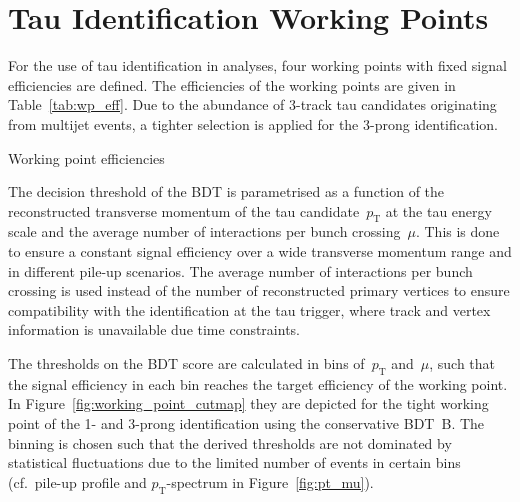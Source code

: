 \section{Tau Identification Working Points}
\label{sec:bdt_working_points}

For the use of tau identification in analyses, four working points with fixed
signal efficiencies are defined. The efficiencies of the working points are
given in Table~\ref{tab:wp_eff}. Due to the abundance of 3-track tau candidates
originating from multijet events, a tighter selection is applied for the 3-prong
identification.

\begin{table}[htb]
  \centering
  {\small}
  \caption{Working point efficiencies}
  \label{tab:wp_eff}
\end{table}

The decision threshold of the BDT is parametrised as a function of the
reconstructed transverse momentum of the tau candidate~$p_\text{T}$ at the tau
energy scale and the average number of interactions per bunch crossing~$\mu$.
This is done to ensure a constant signal efficiency over a wide transverse
momentum range and in different pile-up scenarios. The average number of
interactions per bunch crossing is used instead of the number of reconstructed
primary vertices to ensure compatibility with the identification at the tau
trigger, where track and vertex information is unavailable due time constraints.

The thresholds on the BDT score are calculated in bins of~$p_\text{T}$
and~$\mu$, such that the signal efficiency in each bin reaches the target
efficiency of the working point. In Figure~\ref{fig:working_point_cutmap} they
are depicted for the tight working point of the 1- and 3-prong identification
using the conservative \mbox{BDT B}. The binning is chosen such that the derived
thresholds are not dominated by statistical fluctuations due to the limited
number of events in certain bins (cf.\ pile-up profile and $p_\text{T}$-spectrum
in Figure~\ref{fig:pt_mu}).

